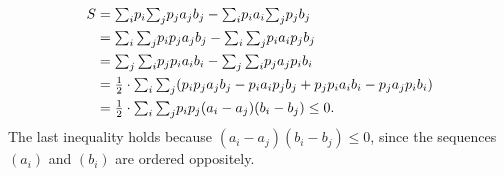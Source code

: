 \documentclass[oneside,final]{ucr}
\def\dsp{\def\baselinestretch{2.0}\large\normalsize}
\def\ssp{\def\baselinestretch{1.0}\large\normalsize}
\begin{document}
\ssp
\begin{align*}
  S &= \textstyle{\sum_i} p_i \textstyle{\sum_j} p_j a_j b_j - \textstyle{\sum_i} p_i a_i \textstyle{\sum_j} p_j b_j
	\\
  & = \textstyle{\sum_i \sum_j} p_i p_j a_j b_j - \textstyle{\sum_i \sum_j} p_i a_i p_j b_j
	\\
  & = \textstyle{\sum_j \sum_i} p_j p_i a_i b_i - \textstyle{\sum_j \sum _i} p_j a_j p_i b_i
	\\
	&= {\mbox{$\frac{1}{2}$}} \cdot \textstyle{\sum_i \sum_j} (p_i p_j a_j b_j - p_i a_i p_j b_j + p_j p_i a_i
  							b_i - p_j a_j p_i b_i)
\\
  &= {\mbox{$\frac{1}{2}$}} \cdot \textstyle{\sum_i \sum_j} p_i p_j (a_i - a_j)(b_i - b_j) \leq 0.
\end{align*}
\dsp
The last inequality holds because $(a_i-a_j)(b_i-b_j) \leq
0$, since the sequences $(a_i)$ and $(b_i)$ are ordered
oppositely.
\end{document}
